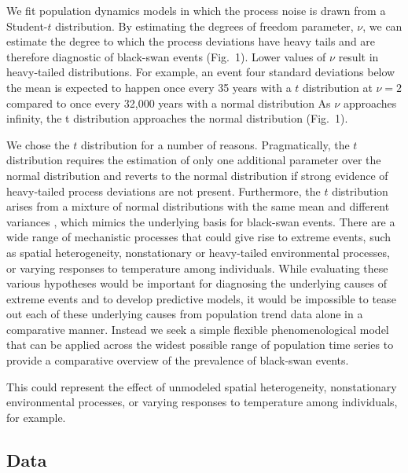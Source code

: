 We fit population dynamics models in which the process noise is
drawn from a Student-$t$ distribution. By estimating the degrees of freedom
parameter, \(\nu\), we can estimate the degree to which the process deviations
have heavy tails and are therefore diagnostic of black-swan events (Fig.~1).
Lower values of \(\nu\) result in heavy-tailed distributions.
For example, an event four standard deviations below the mean
is expected to happen once every 35 years with a $t$ distribution at \(\nu = 2\)
compared to once every 32,000 years with a normal distribution
As \(\nu\) approaches infinity, the t
distribution approaches the normal distribution (Fig.~1).

We chose the $t$ distribution for a number of reasons. 
Pragmatically, the $t$ distribution requires the estimation of only one additional
parameter over the normal distribution and reverts to the normal distribution
if strong evidence of heavy-tailed process deviations are not present.
Furthermore, the $t$ distribution arises from a mixture of normal distributions
with the same mean and different variances \citep{gelman2014},
which mimics the underlying basis for black-swan events.
There are a wide range of mechanistic processes 
that could give rise to extreme events,
such as spatial heterogeneity, nonstationary or heavy-tailed environmental processes, 
or varying responses to temperature among individuals. 
While evaluating these various hypotheses 
would be important for diagnosing the underlying causes 
of extreme events and to develop predictive models, 
it would be impossible to tease out each of these 
underlying causes from population trend data alone in a comparative manner. 
Instead we seek a simple flexible phenomenological model 
that can be applied across the widest possible 
range of population time series to provide a 
comparative overview of the prevalence 
of black-swan events. 

This could represent the effect of unmodeled spatial heterogeneity,
nonstationary environmental processes, or
varying responses to temperature among individuals, for example.

\subsection{Data}

